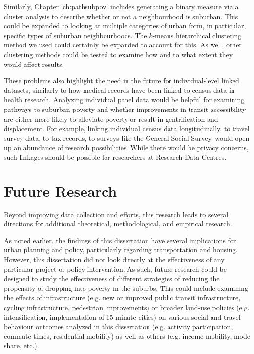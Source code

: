 Similarly, Chapter \ref{ch:pathsubpov} includes generating a binary measure via a cluster analysis to describe whether or not a neighbourhood is suburban. This could be expanded to looking at multiple categories of urban form, in particular, specific types of suburban neighbourhoods. The $k$-means hierarchical clustering method we used could certainly be expanded to account for this. As well, other clustering methods could be tested to examine how and to what extent they would affect results.


These problems also highlight the need in the future for individual-level linked datasets, similarly to how medical records have been linked to census data in health research. Analyzing individual panel data would be helpful for examining pathways to suburban poverty and whether improvements in transit accessibility are either more likely to alleviate poverty or result in gentrification and displacement. For example, linking individual census data longitudinally, to travel survey data, to tax records, to surveys like the General Social Survey, would open up an abundance of research possibilities. While there would be privacy concerns, such linkages should be possible for researchers at Research Data Centres.



\section{Future Research}

Beyond improving data collection and efforts, this research leads to several directions for additional theoretical, methodological, and empirical research. 

As noted earlier, the findings of this dissertation have several implications for urban planning and policy, particularly regarding transportation and housing. However, this dissertation did not look directly at the effectiveness of any particular project or policy intervention. As such, future research could be designed to study the effectiveness of different strategies of reducing the propensity of dropping into poverty in the suburbs. This could include examining the effects of infrastructure (e.g. new or improved public transit infrastructure, cycling infrastructure, pedestrian improvements) or broader land-use policies (e.g. intensification, implementation of 15-minute cities) on various social and travel behaviour outcomes analyzed in this dissertation (e.g. activity participation, commute times, residential mobility) as well as others (e.g. income mobility, mode share, etc.).

